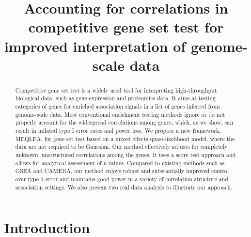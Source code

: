 \documentclass[useAMS,usenatbib, galley]{biom}
\title[This is an Example of Recto Running Head]{Accounting for correlations in competitive gene set test for improved interpretation of genome-scale data}
\newcommand{\OurMethod}{MEQLEA}
\begin{document}




\label{firstpage}


\begin{abstract}
Competitive gene set test is a widely used tool for interpreting high-throughput biological data, such as gene expression and proteomics data. It aims at testing categories of genes for enriched association signals in a list of genes inferred from genome-wide data. Most conventional enrichment testing methods ignore or do not properly account for the widespread correlations among genes, which, as we show, can result in inflated type I error rates and power loss. We propose a new framework, \OurMethod, for gene set test based on a mixed effects quasi-likelihood model, where the data are not required to be Gaussian. Our method effectively adjusts for completely unknown, unstructured correlations among the genes. It uses a score test approach and allows for analytical assessment of $p$-values. Compared to existing methods such as GSEA and CAMERA, our method enjoys robust and substantially improved control over type 1 error and maintains good power in a variety of correlation structure and association settings. We also present two real data analysis to illustrate our approach.
\end{abstract}

%
%

\begin{keywords}
\end{keywords}

\maketitle

	\section{Introduction}\label{section:introduction}
	
\end{document}
